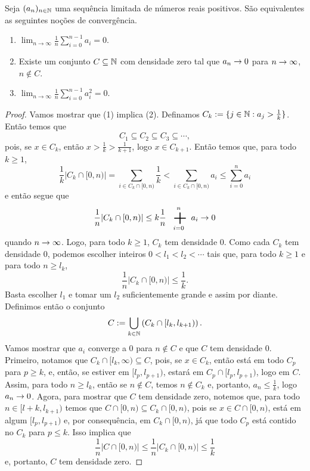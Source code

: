 \begin{lemma}
	Seja $(a_n)_{n \in \mathbb{N}}$ uma sequência limitada de números reais positivos. São equivalentes as seguintes noções de convergência.
	\begin{enumerate}
	\item $\lim_{n \to \infty} \frac{1}{n} \displaystyle\sum_{i=0}^{n-1} a_i =0$.
	\item Existe um conjunto $C \subseteq \mathbb{N}$ com densidade zero tal que $a_n \rightarrow 0$ para $n \rightarrow \infty$, $n \notin C$.
	\item $\lim_{n \to \infty} \frac{1}{n} \displaystyle\sum_{i=0}^{n-1} a_i^2 =0$.
	\end{enumerate}
\end{lemma}
\begin{proof}
Vamos mostrar que (1) implica (2). Definamos $C_k := \{j \in \mathbb{N}:a_j>\frac{1}{k}\}$. Então temos que
	\begin{equation}
	C_1 \subseteq C_2 \subseteq C_3 \subseteq \cdots,
	\end{equation}
pois, se $x \in C_k$, então $x >\frac{1}{k}>\frac{1}{k+1}$, logo $x \in C_{k+1}$. Então temos que, para todo $k \geq 1$,
	\begin{equation*}
	\frac{1}{k} |C_k \cap [0,n)| = \sum_{i \in C_k \cap [0,n)} \frac{1}{k} < \sum_{i \in C_k \cap [0,n)} a_i \leq \sum_{i=0}^n a_i
	\end{equation*}
e então segue que
	\begin{equation*}
	\frac{1}{n}  |C_k \cap [0,n)| \leq k\frac{1}{n}\sum_{i=0}^n a_i \conv 0
	\end{equation*}
quando $n \rightarrow \infty$. Logo, para todo $k \geq 1$, $C_k$ tem densidade $0$. Como cada $C_k$ tem densidade $0$, podemos escolher inteiros $0<l_1<l_2<\cdots$ tais que, para todo $k \geq 1$ e para todo $n \geq l_k$,
	\begin{equation}
	\frac{1}{n}  |C_k \cap [0,n)| \leq \frac{1}{k}.
	\end{equation}
Basta escolher $l_1$ e tomar um $l_2$ suficientemente grande e assim por diante. Definimos então o conjunto
	\begin{equation}
	C := \bigcup_{k \in \mathbb{N}} \left(C_k \cap [l_k,l_{k+1})\right).
	\end{equation}
Vamos mostrar que $a_i$ converge a $0$ para $n \notin C$ e que $C$ tem densidade $0$. Primeiro, notamos que $C_k \cap [l_k,\infty) \subseteq C$, pois, se $x \in C_k$, então está em todo $C_p$ para $p \geq k$, e, então, se estiver em $[l_p,l_{p+1})$, estará em $C_p \cap [l_p,l_{p+1})$, logo em $C$. Assim, para todo $n \geq l_k$, então se $n \notin C$, temos $n \notin C_k$ e, portanto, $a_n \leq \frac{1}{k}$, logo $a_n \rightarrow 0$. Agora, para mostrar que $C$ tem densidade zero, notemos que, para todo $n \in [l+k,l_{k+1})$ temos que $C \cap [0,n) \subseteq C_k \cap [0,n)$, pois se $x \in C \cap [0,n)$, está em algum $[l_p,l_{p+1})$ e, por consequência, em $C_k \cap [0,n)$, já que todo $C_p$ está contido no $C_k$ para $p \leq k$. Isso implica que
	\begin{equation}
	\frac{1}{n} |C \cap [0,n)| \leq \frac{1}{n}  |C_k \cap [0,n)| \leq \frac{1}{k}
	\end{equation}
e, portanto, $C$ tem densidade zero.


\end{proof}
